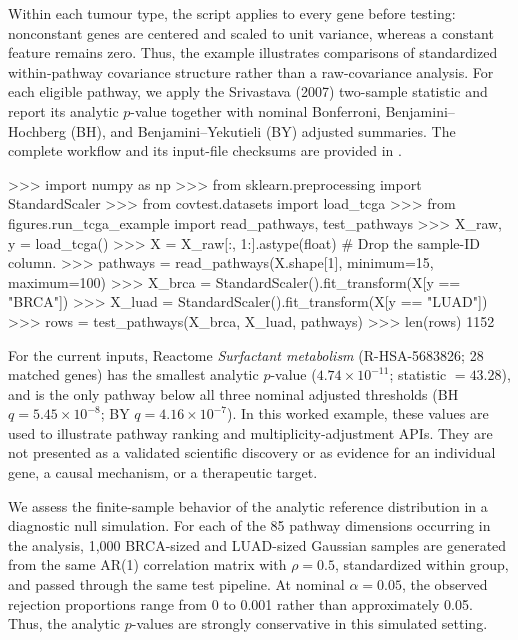 Within each tumour type, the script applies  to every
gene before testing: nonconstant genes are centered and scaled to unit
variance, whereas a constant feature remains zero. Thus, the example
illustrates comparisons of standardized within-pathway covariance structure
rather than a raw-covariance analysis. For each eligible pathway, we apply the
Srivastava (2007) two-sample
statistic and report its analytic $p$-value together with nominal Bonferroni,
Benjamini--Hochberg (BH), and Benjamini--Yekutieli (BY) adjusted summaries.
The complete workflow and its input-file checksums are provided in
.

\begin{CodeChunk}
\begin{CodeInput}
>>> import numpy as np
>>> from sklearn.preprocessing import StandardScaler
>>> from covtest.datasets import load_tcga
>>> from figures.run_tcga_example import read_pathways, test_pathways
>>> X_raw, y = load_tcga()
>>> X = X_raw[:, 1:].astype(float)  # Drop the sample-ID column.
>>> pathways = read_pathways(X.shape[1], minimum=15, maximum=100)
>>> X_brca = StandardScaler().fit_transform(X[y == "BRCA"])
>>> X_luad = StandardScaler().fit_transform(X[y == "LUAD"])
>>> rows = test_pathways(X_brca, X_luad, pathways)
>>> len(rows)
1152
\end{CodeInput}
\end{CodeChunk}

For the current inputs, Reactome \emph{Surfactant metabolism}
(R-HSA-5683826; 28 matched genes) has the smallest analytic $p$-value
($4.74 \times 10^{-11}$; statistic $=43.28$), and is the only pathway below
all three nominal adjusted thresholds (BH $q = 5.45 \times 10^{-8}$; BY
$q = 4.16 \times 10^{-7}$). In this worked example, these values are used to
illustrate pathway ranking and multiplicity-adjustment APIs. They are not
presented as a validated scientific discovery or as evidence for an individual
gene, a causal mechanism, or a therapeutic target.

We assess the finite-sample behavior of the analytic reference distribution in
a diagnostic null simulation. For each of the 85 pathway dimensions occurring
in the analysis, 1,000 BRCA-sized and LUAD-sized Gaussian samples are generated
from the same AR(1) correlation matrix with $\rho = 0.5$, standardized within
group, and passed through the same test pipeline. At nominal $\alpha = 0.05$,
the observed rejection proportions range from 0 to 0.001 rather than
approximately 0.05. Thus, the analytic $p$-values are strongly conservative in
this simulated setting.

